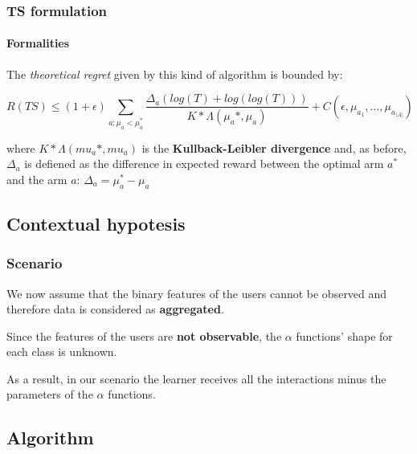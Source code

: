 \documentclass[11pt]{beamer}
\begin{document}

\begin{frame}[fragile]

\frametitle{TS formulation}
\framesubtitle{Formalities}

The \textit{theoretical regret} given by this kind of algorithm is bounded by:

\begin{displaymath}
R(TS) \le (1+\epsilon) \sum_{a:\mu_a < \mu_a^*} \frac{\Delta_a(log(T)+log(log(T)))}{K*\Lambda(\mu_a*, \mu_a)} + C (\epsilon, \mu_{a_1} , ... , \mu_{a_{\left|A\right|}})
\end{displaymath}

where $K*\Lambda(mu_a*,mu_a)$ is the \textbf{Kullback-Leibler divergence} and, as before, $\Delta_a$ is defiened as the difference in expected reward between the optimal arm $a^*$ and the arm $a$: $\Delta_a = \mu_a^* - \mu_a$

\end{frame}


\subsection{Contextual hypotesis}


\begin{frame}

\frametitle{Scenario}

We now assume that the binary features of the users cannot be observed and therefore data is considered as \textbf{aggregated}.

Since the features of the users are \textbf{not observable}, the $\alpha$ functions' shape for each class is unknown.

As a result, in our scenario the learner receives all the interactions minus the parameters of the $\alpha$ functions.

\end{frame}


\subsection{Algorithm}

\end{document}
